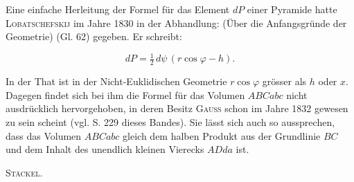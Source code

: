 Eine einfache Herleitung der Formel für das Element $dP$ einer Pyramide hatte
\textsc{Lobatschefskij} im Jahre 1830 in der Abhandlung:  (Über
die Anfangsgründe der Geometrie) (Gl. 62) gegeben. Er schreibt:

\[
dP = \tfrac{1}{2}\, d\psi\,(r\cos\varphi - h).
\]


In der That ist in der Nicht-Euklidischen Geometrie $r\cos\varphi$ grösser als $h$
oder $x$. Dagegen findet sich bei ihm die Formel für das Volumen $ABCabc$ nicht
ausdrücklich hervorgehoben, in deren Besitz \textsc{Gauss} schon im Jahre 1832
gewesen zu sein scheint (vgl. S. 229 dieses Bandes). Sie lässt sich auch so
aussprechen, dass das Volumen $ABCabc$ gleich dem halben Produkt aus der Grundlinie
$BC$ und dem Inhalt des unendlich kleinen Vierecks $ADda$ ist. \begin{flushright}\textsc{Stäckel.}\end{flushright}



\par\endgroup
